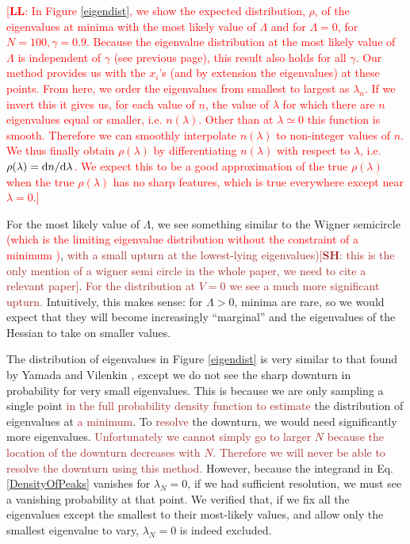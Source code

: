\documentclass[12pt]{article}
\newcommand{\lfl}[1]{\textcolor{red}{[{\bf LL}: #1]}}
\newcommand{\SH}[1]{\textcolor{brown}{[{\bf SH}: #1]}}
\newcommand{\sh}[1]{\textcolor{brown}{#1}}
\newcommand{\LFL}[1]{\textcolor{red}{#1}}
\begin{document}
\lfl{In Figure \ref{eigendist}, we show the expected distribution, $\rho$, of the eigenvalues at minima with the most likely value of $\Lambda$ and for $\Lambda = 0$, for $N = 100, \gamma = 0.9$. Because the eigenvalue distribution at the most likely value of $\Lambda$ is independent of $\gamma$ (see previous page), this result also holds for all $\gamma$. Our method provides us with the $x_i$'s (and by extension the eigenvalues) at these points. From here, we order the eigenvalues from smallest to largest as $\lambda_n$. If we invert this it gives us, for each value of $n$, the value of $\lambda$ for which there are $n$ eigenvalues equal or smaller, i.e. $n(\lambda)$. Other than at $\lambda\simeq 0$ this function is smooth. Therefore we can smoothly interpolate $n(\lambda)$ to non-integer values of $n$. We thus finally obtain $\rho(\lambda)$ by differentiating $n(\lambda)$ with respect to $\lambda$, i.e. $\rho(\lambda) = {\rm d}n/{\rm d}\lambda$. We expect this to be a good approximation of the true $\rho(\lambda)$ when the true $\rho(\lambda)$ has no sharp features, which is true everywhere except near $\lambda=0$.}

For the most likely value of $\Lambda$, we see something similar to the Wigner semicircle \LFL{(which is the limiting eigenvalue distribution without the constraint of a minimum \cite{Wigner1955,Wigner1958})}, \sh{with a small upturn at the lowest-lying eigenvalues)}\SH{this is the only mention of a wigner semi circle in the whole paper, we need to cite a relevant paper}. \sh{For the distribution at $V=0$ we see a much more significant upturn.} Intuitively, this makes sense: for $\Lambda > 0$, minima are rare, so we would expect that they will become increasingly ``marginal'' and the eigenvalues of the Hessian to take on smaller values.

The distribution of eigenvalues in Figure \ref{eigendist} is very similar to that found by Yamada and Vilenkin \cite{Yamada2018}, except we do not see the sharp downturn in probability for very small eigenvalues. This is because we are only sampling a single point \sh{in the full probability density function to estimate} the distribution of eigenvalues at \sh{a minimum}. To \sh{resolve} the downturn, we would need significantly more eigenvalues. \sh{Unfortunately we cannot simply go to larger $N$ because the location of the downturn decreases with $N$. Therefore we will never be able to resolve the downturn using this method.} However, because the integrand in Eq. \ref{DensityOfPeaks} vanishes for $\lambda_N=0$, if we had sufficient resolution, we must see a vanishing probability at that point. We verified that, if we fix all the eigenvalues except the smallest to their most-likely values, and allow only the smallest eigenvalue to vary, $\lambda_N=0$ is indeed excluded.
\end{document}
